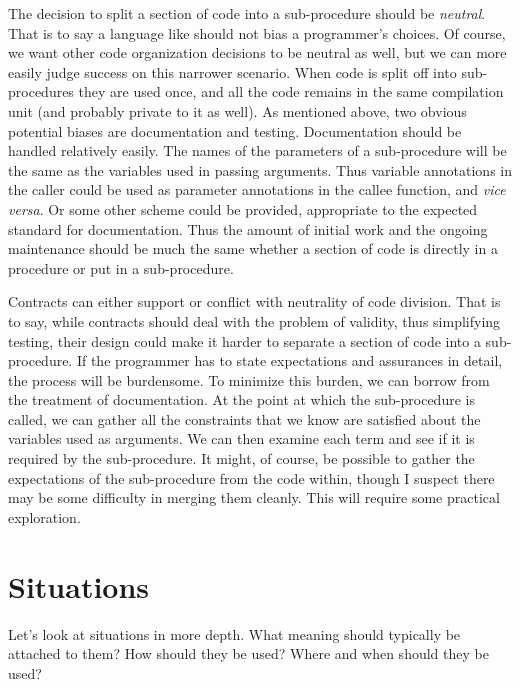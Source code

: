 \documentclass[10pt]{amsart}
\begin{document}
The decision to split a section of code into a sub-procedure should be
\emph{neutral}.  That is to say a language like \Utop should not bias
a programmer's choices.  Of course, we want other code organization
decisions to be neutral as well, but we can more easily judge success
on this narrower scenario.  When code is split off into sub-procedures
they are used once, and all the code remains in the same compilation
unit (and probably private to it as well).  As mentioned above, two
obvious potential biases are documentation and testing.  Documentation
should be handled relatively easily.  The names of the parameters of a
sub-procedure will be the same as the variables used in passing
arguments.  Thus variable annotations in the caller could be used as
parameter annotations in the callee function, and \emph{vice versa}.
Or some other scheme could be provided, appropriate to the expected
standard for documentation.  Thus the amount of initial work and the
ongoing maintenance should be much the same whether a section of code
is directly in a procedure or put in a sub-procedure.

Contracts can either support or conflict with neutrality of code
division.  That is to say, while contracts should deal with the
problem of validity, thus simplifying testing, their design could make
it harder to separate a section of code into a sub-procedure.  If the
programmer has to state expectations and assurances in detail, the
process will be burdensome.  To minimize this burden, we can borrow
from the treatment of documentation.  At the point at which the
sub-procedure is called, we can gather all the constraints that we
know are satisfied about the variables used as arguments.  We can then
examine each term and see if it is required by the sub-procedure.  It
might, of course, be possible to gather the expectations of the
sub-procedure from the code within, though I suspect there may be some
difficulty in merging them cleanly.  This will require some practical
exploration.


\section{Situations}

Let's look at situations in more depth.  What meaning should typically
be attached to them?  How should they be used?  Where and when should
they be used?

\end{document}
